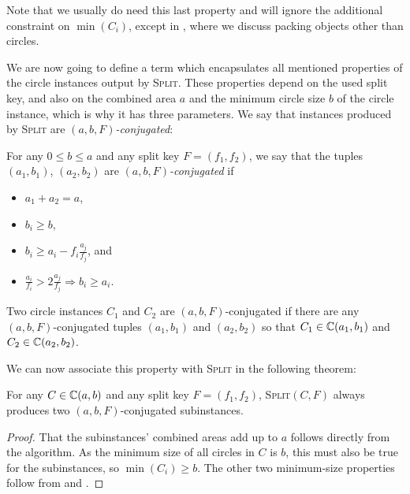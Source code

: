 \documentclass[a4paper,style=print,bibliography=totoc,nexus,lnum,extramargin]{tubsbook}
\begin{document}
Note that we usually do need this last property and will ignore the additional constraint on $\min(C_i)$, except in , where we discuss packing objects other than circles.

We are now going to define a term which encapsulates all mentioned properties of the circle instances output by \textsc{Split}. These properties depend on the used split key, and also on the combined area $a$ and the minimum circle size $b$ of the circle instance, which is why it has three parameters. We say that instances produced by \textsc{Split} are \emph{$(a,b,F)$-conjugated}:

\begin{definition}\label{def:conjugated}
    For any $0 \le b \le a$ and any split key $F = (f_1, f_2)$, we say that the tuples $(a_1, b_1)$, $(a_2, b_2)$ are \emph{$(a,b,F)$-conjugated} if

    \begin{itemize}
        \item $a_1 + a_2 = a$,
        \item $b_i \ge b$,
        \item $b_i \ge a_i - f_i \frac{a_j}{f_j}$, and
        \item $\frac{a_i}{f_i} > 2 \frac{a_j}{f_j} \Rightarrow b_i \ge a_i$.
    \end{itemize}
\end{definition}

\begin{definition}
    Two circle instances $C_1$ and $C_2$ are $(a,b,F)$-conjugated if there are any $(a,b,F)$-conjugated tuples $(a_1, b_1)$ and $(a_2, b_2)$ so that $C_1 \in \mathbb{C}(a_1, b_1)$ and $C_2 \in \mathbb{C}(a_2, b_2)$.
\end{definition}

We can now associate this property with \textsc{Split} in the following theorem:

\begin{theorem}\label{th:split-properties}
    For any $C \in \mathbb{C}(a,b)$ and any split key $F = (f_1, f_2)$, \textsc{Split}$(C,F)$ always produces two $(a,b,F)$-conjugated subinstances.
\end{theorem}

\begin{proof}
    That the subinstances' combined areas add up to $a$ follows directly from the algorithm.
    As the minimum size of all circles in $C$ is $b$, this must also be true for the subinstances, so $\min(C_i) \ge b$.
    The other two minimum-size properties follow from  and .
\end{proof}
\end{document}

